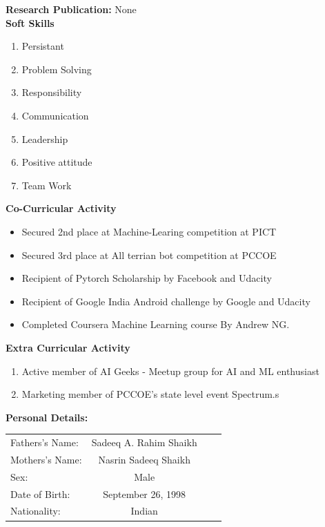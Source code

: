 \documentclass[10pt,twoside,a4paper]{article}
\begin{document}
\noindent
\textbf{Research Publication:}
None\\

\newpage
\noindent
\textbf{Soft Skills}
\begin{enumerate}
\item Persistant
\item Problem Solving
\item Responsibility
\item Communication
\item Leadership
\item Positive attitude
\item Team Work 
\\
\end{enumerate}

\noindent
\textbf{Co-Curricular Activity}
\begin{itemize}
\item Secured 2nd place at Machine-Learing competition at PICT
\item Secured 3rd place at All terrian bot competition at PCCOE 
\item Recipient of Pytorch Scholarship by Facebook and Udacity
\item Recipient of Google India Android challenge by Google and Udacity
\item Completed Coursera Machine Learning course By Andrew NG.
\end{itemize}


\noindent
\textbf{Extra Curricular Activity}
\begin{enumerate}
\item Active member of AI Geeks - Meetup group for AI and ML enthusiast
\item Marketing member of PCCOE's state level event Spectrum.s
\end{enumerate}

\noindent
\textbf{Personal Details:}
\begin{flushleft}
\begin{tabular}{l c c l}
Fathers\rq{}s Name: & Sadeeq A. Rahim Shaikh\\
Mothers\rq{}s Name:& Nasrin Sadeeq Shaikh\\
Sex:&Male\\
Date of Birth:& September 26, 1998 \\
Nationality:& Indian\\
\end{tabular}
\end{flushleft}
\end{document}
